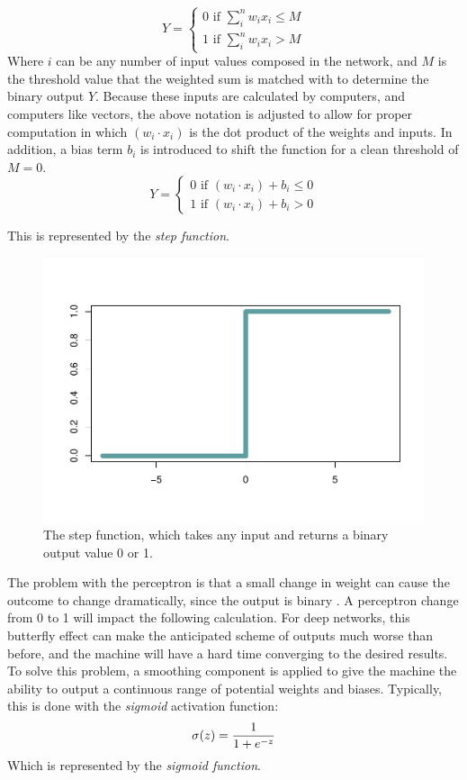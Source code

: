 \[
Y = 
\begin{cases}
0 \text{ if } \sum_i^n w_ix_i \le M \\
1 \text{ if } \sum_i^n w_ix_i > M
\end{cases}
\] Where \(i\) can be any number of input values composed in the
network, and \(M\) is the threshold value that the weighted sum is
matched with to determine the binary output \(Y\).  Because these inputs are calculated by computers, and computers like
vectors, the above notation is adjusted to allow for proper computation in which $(w_i \cdot x_i)$ is the dot product of the weights and inputs. In
addition, a bias term $b_i$ is introduced to shift the function for a clean threshold of \(M = 0\). \[
Y = 
\begin{cases}
0 \text{ if } (w_i \cdot x_i) + b_i \le 0 \\
1 \text{ if } (w_i \cdot x_i) + b_i > 0
\end{cases}
\]

This is represented by the \emph{step function}.

\begin{figure}[H]
    \centering
    \vspace{-40pt}
    \includegraphics[width = .7\textwidth]{Figures/step-function-1.pdf}
    \vspace{-40pt}
    \caption{\footnotesize The step function, which takes any input and returns a binary output value 0 or 1.}
\end{figure}

The problem with the perceptron is that a small change in weight can
cause the outcome to change dramatically, since the output is binary \cite{nielsen}.  A perceptron change from 0 to 1 will impact the following calculation. For deep networks, this butterfly effect can make the anticipated scheme of outputs much worse than before, and the machine will have a hard time converging to the desired results.  To solve this problem, a smoothing component is applied to give the machine the ability to output a continuous range of potential weights and biases.  Typically, this is done with the \textit{sigmoid} activation function:
\[
\sigma(z) = \frac{1}{1+e^{-z}} \\
\]
Which is represented by the \emph{sigmoid function}.

